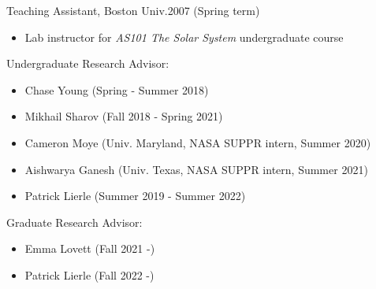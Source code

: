 \documentclass[12pt]{report}
\begin{document}
\noindent Teaching Assistant, Boston Univ.\hfill 2007 (Spring term)
   \begin{itemize} \itemsep -2pt %
   \item Lab instructor for \textit{AS101 The Solar System} undergraduate course
 \end{itemize}
\noindent Undergraduate Research Advisor: 
\begin{itemize} \itemsep -2pt 
	\item Chase Young (Spring - Summer 2018)
	\item Mikhail Sharov (Fall 2018 - Spring 2021)
	\item Cameron Moye (Univ. Maryland, NASA SUPPR intern, Summer 2020)
	\item Aishwarya Ganesh (Univ. Texas, NASA SUPPR intern, Summer 2021)
	\item Patrick Lierle (Summer 2019 - Summer 2022)
\end{itemize}
\noindent Graduate Research Advisor: 
\begin{itemize} \itemsep -2pt
	\item Emma Lovett (Fall 2021 -)
	\item Patrick Lierle (Fall 2022 -) 
\end{itemize}

\end{document}
